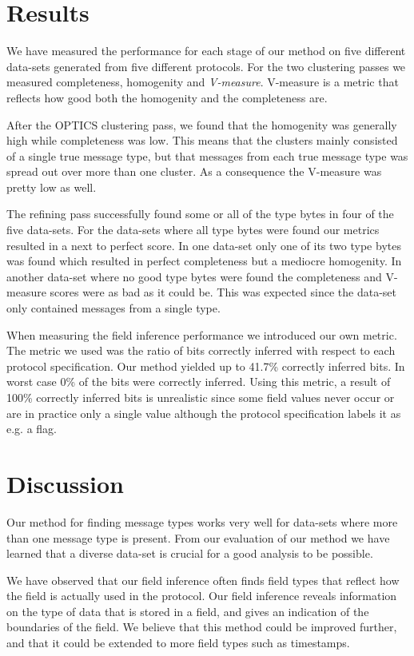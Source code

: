 \documentclass[a4paper,twocolumn]{article}
\begin{document}
\section{Results}
We have measured the performance for each stage of our method on five
different data-sets generated from five different protocols. For the two
clustering passes we measured completeness, homogenity and \emph{V-measure}.
V-measure is a metric that reflects how good both the homogenity and the
completeness are. 

After the OPTICS clustering pass, we found that the homogenity was generally
high while completeness was low. This means that the clusters mainly
consisted of a single true message type, but that messages from each true
message type was spread out over more than one cluster. As a consequence the
V-measure was pretty low as well.

The refining pass successfully found some or all of the type bytes
in four of the five data-sets. For the data-sets where all type bytes
were found our metrics resulted in a next to perfect score. In one data-set
only one of its two type bytes was found which resulted in perfect
completeness but a mediocre homogenity. In another data-set where no good
type bytes were found the completeness and V-measure scores were as bad as
it could be. This was expected since the data-set only contained messages
from a single type.

When measuring the field inference performance we introduced our own metric.
The metric we used was the ratio of bits correctly inferred with respect to
each protocol specification. Our method yielded up to 41.7\% correctly
inferred bits. In worst case 0\% of the bits were correctly inferred.
Using this metric, a result of 100\% correctly inferred bits is unrealistic
since some field values never occur or are in practice only a single value
although the protocol specification labels it as e.g. a flag.

\section{Discussion}
Our method for finding message types works very well for data-sets where more
than one message type is present. From our evaluation of our method we have
learned that a diverse data-set is crucial for a good analysis to be possible.

We have observed that our field inference often finds field types that reflect
how the field is actually used in the protocol. Our field inference reveals
information on the type of data that is stored in a field, and gives an
indication of the boundaries of the field. We believe that this method could
be improved further, and that it could be extended to more field types such
as timestamps.
\end{document}

